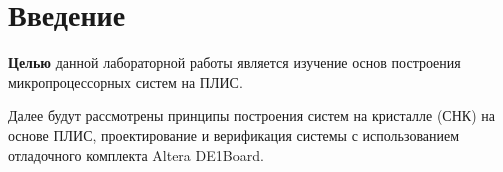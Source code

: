 \chapter*{Введение}

\textbf{Целью} данной лабораторной работы является изучение основ построения микропроцессорных систем на ПЛИС.

Далее будут рассмотрены принципы построения систем на кристалле (СНК) на основе ПЛИС, проектирование и верификация системы с использованием отладочного комплекта Altera DE1Board.